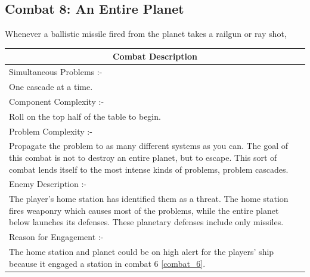 \documentclass[a4paper]{article}
\begin{document}
\subsection{Combat 8: An Entire Planet} \label{combat_8}

Whenever a ballistic missile fired from the planet takes a railgun or ray shot, \newline {}

\begin{minipage}[t]{0.5\linewidth}
\begin{tabular}[t]{| p{7cm} |}
\toprule
\multicolumn{1}{|c|}{Combat Description} \\
\midrule
Simultaneous Problems :- \\
One cascade at a time. \\	
\midrule
Component Complexity :- \\
Roll on the top half of the table to begin. \\
\midrule
Problem Complexity :- \\
Propagate the problem to as many different systems as you can. The goal of this combat is not to destroy an entire planet, but to escape. This sort of combat lends itself to the most intense kinds of problems, problem cascades. \\
\midrule
Enemy Description :- \\
The player's home station has identified them as a threat. The home station fires weaponry which causes most of the problems, while the entire planet below launches its defenses. These planetary defenses include only missiles. \\
\midrule
Reason for Engagement :- \\
The home station and planet could be on high alert for the players' ship because it engaged a station in combat 6 \ref{combat_6}. \\
\bottomrule
\end{tabular}
\end{minipage}
\end{document}
